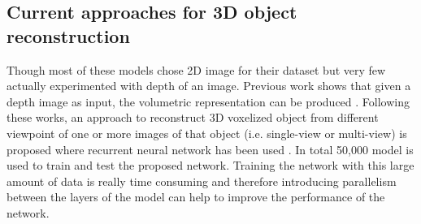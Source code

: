 \documentclass[11pt]{article}       %
\begin{document}
\subsection{Current approaches for 3D object reconstruction } \label{subrev2}
Though most of these models chose 2D image for their dataset but very few actually experimented with depth of an image. Previous work shows that given a depth image as input, the volumetric representation can be produced \cite{dr2}. Following these works, an approach to reconstruct 3D voxelized object from different viewpoint of one or more images of that object (i.e. single-view or multi-view) is proposed where recurrent neural network has been used \cite{dr7}. In total 50,000 model is used to train and test the proposed network. Training the network with this large amount of data is really time consuming and therefore introducing parallelism between the layers of the model can help to improve the performance of the network.\newline
\end{document}
